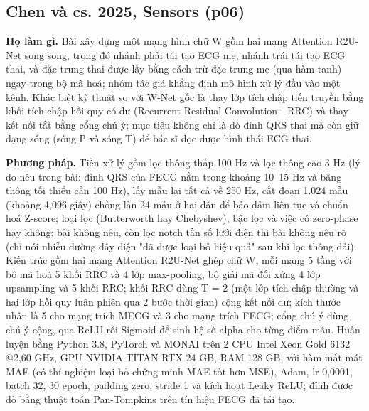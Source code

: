\documentclass[12pt,a4paper]{article}
\begin{document}
\subsection{Chen và cs. 2025, Sensors \normalfont\small (p06)}
\par\vspace{2pt}
\par\vspace{4pt}
\noindent \textbf{Họ làm gì.} Bài xây dựng một mạng hình chữ W gồm hai mạng Attention R2U-Net song song, trong đó nhánh phải tái tạo ECG mẹ, nhánh trái tái tạo ECG thai, và đặc trưng thai được lấy bằng cách trừ đặc trưng mẹ (qua hàm tanh) ngay trong bộ mã hoá; nhóm tác giả khẳng định mô hình xử lý đầu vào một kênh. Khác biệt kỹ thuật so với W-Net gốc là thay lớp tích chập tiến truyền bằng khối tích chập hồi quy có dư (Recurrent Residual Convolution - RRC) và thay kết nối tắt bằng cổng chú ý; mục tiêu không chỉ là dò đỉnh QRS thai mà còn giữ dạng sóng (sóng P và sóng T) để bác sĩ đọc được hình thái ECG thai.\par\vspace{3pt}
\noindent \textbf{Phương pháp.} Tiền xử lý gồm lọc thông thấp 100 Hz và lọc thông cao 3 Hz (lý do nêu trong bài: đỉnh QRS của FECG nằm trong khoảng 10–15 Hz và băng thông tối thiểu cần 100 Hz), lấy mẫu lại tất cả về 250 Hz, cắt đoạn 1.024 mẫu (khoảng 4,096 giây) chồng lấn 24 mẫu ở hai đầu để bảo đảm liên tục và chuẩn hoá Z-score; loại lọc (Butterworth hay Chebyshev), bậc lọc và việc có zero-phase hay không: bài không nêu, còn lọc notch tần số lưới điện thì bài không nêu rõ (chỉ nói nhiễu đường dây điện "đã được loại bỏ hiệu quả" sau khi lọc thông dải). Kiến trúc gồm hai mạng Attention R2U-Net ghép chữ W, mỗi mạng 5 tầng với bộ mã hoá 5 khối RRC và 4 lớp max-pooling, bộ giải mã đối xứng 4 lớp upsampling và 5 khối RRC; khối RRC dùng T = 2 (một lớp tích chập thường và hai lớp hồi quy luân phiên qua 2 bước thời gian) cộng kết nối dư; kích thước nhân là 5 cho mạng trích MECG và 3 cho mạng trích FECG; cổng chú ý dùng chú ý cộng, qua ReLU rồi Sigmoid để sinh hệ số alpha cho từng điểm mẫu. Huấn luyện bằng Python 3.8, PyTorch và MONAI trên 2 CPU Intel Xeon Gold 6132 @2,60 GHz, GPU NVIDIA TITAN RTX 24 GB, RAM 128 GB, với hàm mất mát MAE (có thí nghiệm loại bỏ chứng minh MAE tốt hơn MSE), Adam, lr 0,0001, batch 32, 30 epoch, padding zero, stride 1 và kích hoạt Leaky ReLU; đỉnh được dò bằng thuật toán Pan-Tompkins trên tín hiệu FECG đã tái tạo.\par\vspace{3pt}
\end{document}
